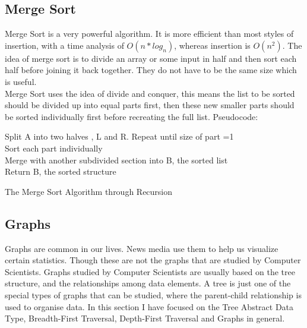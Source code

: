 \documentclass[10pt,twocolumn]{IEEEtran}
\begin{document}
\subsection{Merge Sort}
Merge Sort is a very powerful algorithm. It is more efficient than most styles of insertion, with a time analysis of $O(n * log_{n})$, whereas insertion is $O(n^2)$. The idea of merge sort is to divide an array or some input in half and then sort each half before joining it back together. They do not have to be the same size which is useful.  \\
Merge Sort uses the idea of divide and conquer, this means the list to be sorted should be divided up into equal parts first, then these new smaller parts should be sorted individually first before recreating the full list.
Pseudocode:
\IncMargin{1em}
\begin{algorithm}
	\SetAlgoLined
  	{Split A into two halves , L and R. Repeat until size of part =1\\
  	Sort each part individually \\
  	Merge with another subdivided section into B, the sorted list\\ 
  	Return B, the sorted structure}
\caption{The Merge Sort Algorithm through Recursion}
\end{algorithm}\DecMargin{1em}

	\subsection{Graphs}
	Graphs are common in our lives. News media use them to help us visualize certain statistics. Though these are not the graphs that are studied by Computer Scientists. Graphs studied by Computer Scientists are usually based on the tree structure, and the relationships 	among data elements. A tree is just one of the special types of graphs that can be studied, where the parent-child relationship is used to organise data. In this section I have focused on the Tree Abstract Data Type, Breadth-First Traversal, Depth-First Traversal and Graphs in general. \\
\end{document}
